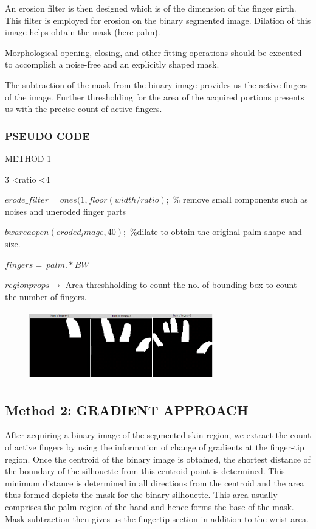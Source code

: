 \documentclass[conference]{IEEEtran}
\begin{document}
An erosion filter is then designed which is of the dimension of the finger girth. This filter is employed for erosion on the binary segmented image. Dilation of this image helps obtain the mask (here palm).

Morphological opening, closing, and other fitting operations should be executed to accomplish a noise-free and an explicitly shaped mask.

The subtraction of the mask\cite{7279962} from the binary image provides us the active fingers of the image. Further thresholding for the area of the acquired portions presents us with the precise count of active fingers.


\subsubsection{PSEUDO CODE}

METHOD 1 

 3 \textless ratio \textless 4 

$erode\_filter=ones(1,floor(width/ratio); $ \% remove small components such as noises and uneroded finger parts
 
$bwareaopen(eroded_image,40);$ \%dilate to obtain the original palm shape and size. 

$fingers=~palm.*BW$ 

$regionprops \rightarrow$ Area threshholding to count the no. of bounding box to count the number of fingers.

\begin{figure}[h!]
	\centering
	\includegraphics[width = 8cm, height = 3cm]{method1_1}
\end{figure}

\subsection{Method 2: GRADIENT APPROACH}
After acquiring a binary image of the segmented skin region, we extract the count of active fingers by using the information of change of gradients at the finger-tip region.
Once the centroid of the binary image is obtained, the shortest distance of the boundary of the silhouette from this centroid point is determined. This minimum distance is determined in all directions from the centroid and the area thus formed depicts the mask for the binary silhouette. This area usually comprises the palm region of the hand and hence forms the base of the mask\cite{6481804}. Mask subtraction then gives us the fingertip section in addition to the wrist area.
\end{document}
